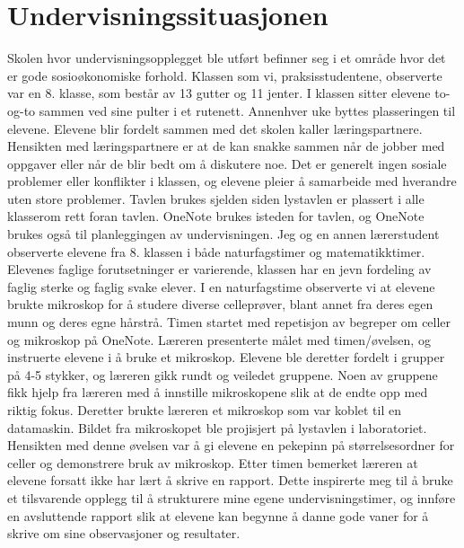 \documentclass[main.tex]{subfiles}
\begin{document}
\section*{Undervisningssituasjonen}
Skolen hvor undervisningsopplegget ble utført befinner seg i et område hvor det er gode 
sosioøkonomiske forhold. Klassen som vi, praksisstudentene, observerte var en 8. klasse, som består 
av 13 gutter og 11 jenter. I klassen sitter elevene to-og-to sammen ved sine pulter i et rutenett. 
Annenhver uke byttes plasseringen til elevene. Elevene blir fordelt sammen med det skolen kaller 
læringspartnere. Hensikten med læringspartnere er at de kan snakke sammen når de jobber med oppgaver 
eller når de blir bedt om å diskutere noe.  Det er generelt ingen sosiale problemer 
eller konflikter i klassen, og elevene pleier å samarbeide med hverandre uten store problemer. Tavlen 
brukes sjelden siden lystavlen er plassert i alle klasserom rett foran tavlen. OneNote brukes isteden 
for tavlen, og OneNote brukes også til planleggingen av undervisningen.
\newline
\newline
Jeg og en annen lærerstudent observerte elevene fra 8. klassen i både naturfagstimer og 
matematikktimer. Elevenes faglige forutsetninger er varierende, klassen har en jevn fordeling av 
faglig sterke og faglig svake elever. I en naturfagstime observerte vi at elevene brukte mikroskop 
for å studere diverse celleprøver, blant annet fra deres egen munn og deres egne hårstrå. Timen 
startet med repetisjon av begreper om celler og mikroskop på OneNote. Læreren presenterte målet med
timen/øvelsen, og instruerte elevene i å bruke et mikroskop. Elevene ble deretter fordelt i grupper 
på 4-5 stykker, og læreren gikk rundt og veiledet gruppene. Noen av gruppene fikk hjelp fra læreren 
med å innstille mikroskopene slik at de endte opp med riktig fokus. Deretter brukte 
læreren et mikroskop som var koblet til en datamaskin. Bildet fra mikroskopet ble projisjert på 
lystavlen i laboratoriet. Hensikten med denne øvelsen var å gi elevene en pekepinn på 
størrelsesordner for celler og demonstrere bruk av mikroskop. Etter timen bemerket læreren at 
elevene forsatt ikke har lært å skrive en rapport. Dette inspirerte meg til å bruke et tilsvarende 
opplegg til å strukturere mine egene undervisningstimer, og innføre en avsluttende rapport 
slik at elevene kan begynne å danne gode vaner for å skrive om sine observasjoner og resultater.
\end{document}
